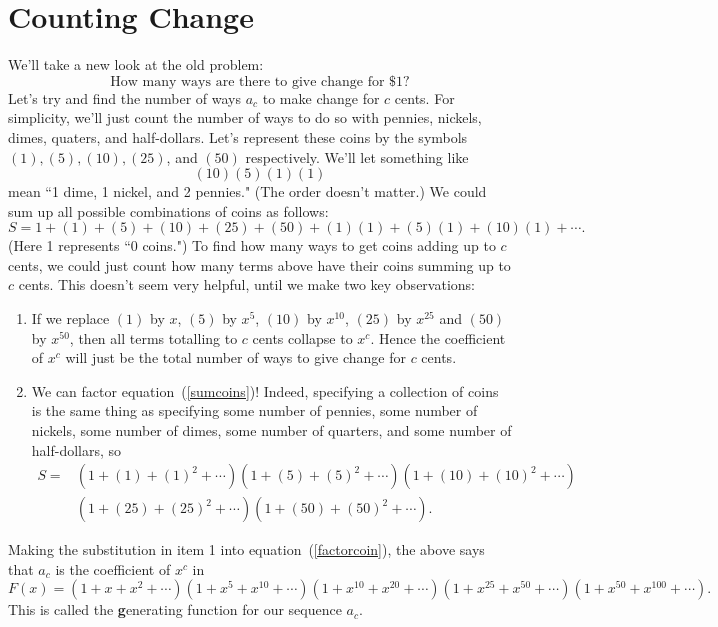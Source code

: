 \documentclass[12pt,twoside]{article}
\theoremstyle{norm}
\begin{document}
\section{Counting Change}
We'll take a new look at the old problem:
\[
\text{
How many ways are there to give change for \$1?
}
\]
Let's try and find the number of ways $a_c$ to make change for $c$ cents. For simplicity, we'll just count the number of ways to do so with pennies, nickels, dimes, quaters, and half-dollars. Let's represent these coins by the symbols $(1),(5),(10), (25)$, and $(50)$ respectively. We'll let something like
\[
(10)(5)(1)(1)
\]
mean ``1 dime, 1 nickel, and 2 pennies." (The order doesn't matter.) We could sum up all possible combinations of coins as follows:
\begin{equation}\label{sumcoins}
S=1+(1)+(5)+(10)+(25)+(50)+(1)(1)+(5)(1)+(10)(1)+\cdots.
\end{equation}
(Here 1 represents ``0 coins.") 
To find how many ways to get coins adding up to $c$ cents, we could just count how many terms above have their coins summing up to $c$ cents. This doesn't seem very helpful, until we make two key observations:
\begin{enumerate}
\item If we replace $(1)$ by $x$, $(5)$ by $x^5$, $(10)$ by $x^{10}$, $(25)$ by $x^{25}$ and $(50)$ by $x^{50}$, then all terms totalling to $c$ cents collapse to $x^c$. Hence the coefficient of $x^c$ will just be the total number of ways to give change for $c$ cents.
\item We can factor equation~(\ref{sumcoins})! Indeed, specifying a collection of coins is the same thing as specifying some number of pennies, some number of nickels, some number of dimes, some number of quarters, and some number of half-dollars, so
\begin{equation}\label{factorcoin}
\begin{split}
S=&(1+(1)+(1)^2+\cdots)(1+(5)+(5)^2+\cdots)(1+(10)+(10)^2+\cdots)\\
&(1+(25)+(25)^2+\cdots)(1+(50)+(50)^2+\cdots).
\end{split}
\end{equation}
\end{enumerate}
Making the substitution in item 1 into equation~(\ref{factorcoin}), the above says that 
$a_c$ is the coefficient of $x^c$ in
\[
F(x)=(1+x+x^2+\cdots)(1+x^5+x^{10}+\cdots)(1+x^{10}+x^{20}+\cdots)
(1+x^{25}+x^{50}+\cdots)(1+x^{50}+x^{100}+\cdots).
\]
This is called the {\textbf generating function} for our sequence $a_c$. 
\end{document}
